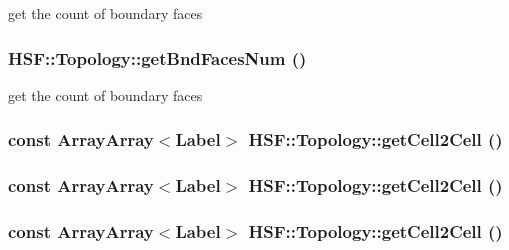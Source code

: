 get the count of boundary faces \hypertarget{classHSF_1_1Topology_a14bba9407c2c026f94acbd9915bfa2a0}{
\subsubsection[{getBndFacesNum}]{ HSF::Topology::getBndFacesNum ()}}
\label{classHSF_1_1Topology_a14bba9407c2c026f94acbd9915bfa2a0}


get the count of boundary faces \hypertarget{classHSF_1_1Topology_a5ae4e7f4f97d8946a3319a642d0b37b9}{
\subsubsection[{getCell2Cell}]{\setlength{\rightskip}{0pt plus 5cm}const {\bf ArrayArray}$<${\bf Label}$>$ HSF::Topology::getCell2Cell ()}}
\label{classHSF_1_1Topology_a5ae4e7f4f97d8946a3319a642d0b37b9}
\hypertarget{classHSF_1_1Topology_a5ae4e7f4f97d8946a3319a642d0b37b9}{
\subsubsection[{getCell2Cell}]{\setlength{\rightskip}{0pt plus 5cm}const {\bf ArrayArray}$<${\bf Label}$>$ HSF::Topology::getCell2Cell ()}}
\label{classHSF_1_1Topology_a5ae4e7f4f97d8946a3319a642d0b37b9}
\hypertarget{classHSF_1_1Topology_a5ae4e7f4f97d8946a3319a642d0b37b9}{
\subsubsection[{getCell2Cell}]{\setlength{\rightskip}{0pt plus 5cm}const {\bf ArrayArray}$<${\bf Label}$>$ HSF::Topology::getCell2Cell ()}}
